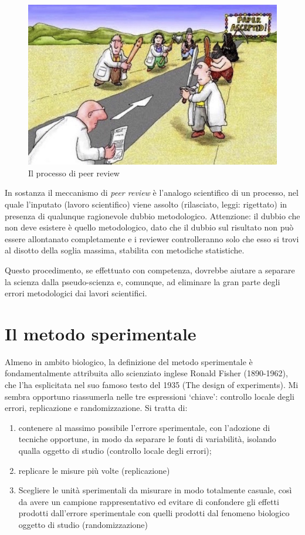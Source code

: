 \documentclass[a4paper,12pt,oneside]{book}
\providecommand{\tightlist}{%
  \setlength{\itemsep}{0pt}\setlength{\parskip}{0pt}}
\theoremstyle{definition}
\theoremstyle{definition}
\theoremstyle{definition}
\theoremstyle{remark}
\begin{document}
\begin{figure}

{\centering \includegraphics[width=0.75\linewidth]{_images/PeerReview} 

}

\caption{Il processo di peer review}\label{fig:figName3}
\end{figure}

In sostanza il meccanismo di \emph{peer review} è l'analogo scientifico
di un processo, nel quale l'inputato (lavoro scientifico) viene assolto
(rilasciato, leggi: rigettato) in presenza di qualunque ragionevole
dubbio metodologico. Attenzione: il dubbio che non deve esistere è
quello metodologico, dato che il dubbio sul risultato non può essere
allontanato completamente e i reviewer controlleranno solo che esso si
trovi al disotto della soglia massima, stabilita con metodiche
statistiche.

Questo procedimento, se effettuato con competenza, dovrebbe aiutare a
separare la scienza dalla pseudo-scienza e, comunque, ad eliminare la
gran parte degli errori metodologici dai lavori scientifici.

\section{Il metodo sperimentale}\label{il-metodo-sperimentale}

Almeno in ambito biologico, la definizione del metodo sperimentale è
fondamentalmente attribuita allo scienziato inglese Ronald Fisher
(1890-1962), che l'ha esplicitata nel suo famoso testo del 1935 (The
design of experiments). Mi sembra opportuno riassumerla nelle tre
espressioni `chiave': controllo locale degli errori, replicazione e
randomizzazione. Si tratta di:

\begin{enumerate}
\def\labelenumi{\arabic{enumi}.}
\tightlist
\item
  contenere al massimo possibile l'errore sperimentale, con l'adozione
  di tecniche opportune, in modo da separare le fonti di variabilità,
  isolando qualla oggetto di studio (controllo locale degli errori);
\item
  replicare le misure più volte (replicazione)
\item
  Scegliere le unità sperimentali da misurare in modo totalmente
  casuale, così da avere un campione rappresentativo ed evitare di
  confondere gli effetti prodotti dall'errore sperimentale con quelli
  prodotti dal fenomeno biologico oggetto di studio (randomizzazione)
\end{enumerate}
\end{document}
